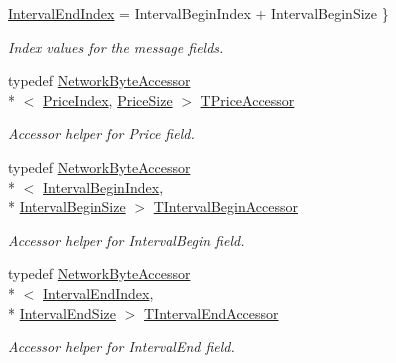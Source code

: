 \begin{DoxyCompactItemize}
\hyperlink{class_terra_swarm_1_1_synchronous_1_1_price_proposal_a32c76156dee2511c9aa14a90995639c8abbbf6c709acc6b1a4b2cf07f3145bccf}{Interval\-End\-Index} = Interval\-Begin\-Index + Interval\-Begin\-Size
 \}
\begin{DoxyCompactList}\small\item\em Index values for the message fields. \end{DoxyCompactList}\item 
typedef \hyperlink{class_terra_swarm_1_1_network_byte_accessor}{Network\-Byte\-Accessor}\\*
$<$ \hyperlink{class_terra_swarm_1_1_synchronous_1_1_price_proposal_a32c76156dee2511c9aa14a90995639c8a7c993b52da3545f122e21da28f769e64}{Price\-Index}, \hyperlink{class_terra_swarm_1_1_synchronous_1_1_price_proposal_ab2ea7dd828cca1f7635018608f595f0bad6e9c96f5e6fdabf253684805f19dfd5}{Price\-Size} $>$ \hyperlink{class_terra_swarm_1_1_synchronous_1_1_price_proposal_a3f7f933da487e691a7d29c0227e1a9c6}{T\-Price\-Accessor}
\begin{DoxyCompactList}\small\item\em Accessor helper for Price field. \end{DoxyCompactList}\item 
typedef \hyperlink{class_terra_swarm_1_1_network_byte_accessor}{Network\-Byte\-Accessor}\\*
$<$ \hyperlink{class_terra_swarm_1_1_synchronous_1_1_price_proposal_a32c76156dee2511c9aa14a90995639c8abadfb7fce0950c70240c2687de80a253}{Interval\-Begin\-Index}, \\*
\hyperlink{class_terra_swarm_1_1_synchronous_1_1_price_proposal_ab2ea7dd828cca1f7635018608f595f0ba2482e22b3b67744f6bb178b36cdc1b91}{Interval\-Begin\-Size} $>$ \hyperlink{class_terra_swarm_1_1_synchronous_1_1_price_proposal_a4a52f34f0b7c60bfc0ca8656cd9c3c5d}{T\-Interval\-Begin\-Accessor}
\begin{DoxyCompactList}\small\item\em Accessor helper for Interval\-Begin field. \end{DoxyCompactList}\item 
typedef \hyperlink{class_terra_swarm_1_1_network_byte_accessor}{Network\-Byte\-Accessor}\\*
$<$ \hyperlink{class_terra_swarm_1_1_synchronous_1_1_price_proposal_a32c76156dee2511c9aa14a90995639c8abbbf6c709acc6b1a4b2cf07f3145bccf}{Interval\-End\-Index}, \\*
\hyperlink{class_terra_swarm_1_1_synchronous_1_1_price_proposal_ab2ea7dd828cca1f7635018608f595f0ba1481cf2a5350361d2fbc2f166ede8c19}{Interval\-End\-Size} $>$ \hyperlink{class_terra_swarm_1_1_synchronous_1_1_price_proposal_ad36cac35c047c96d50ecfb29504e9fd6}{T\-Interval\-End\-Accessor}
\begin{DoxyCompactList}\small\item\em Accessor helper for Interval\-End field. \end{DoxyCompactList}\end{DoxyCompactItemize}
